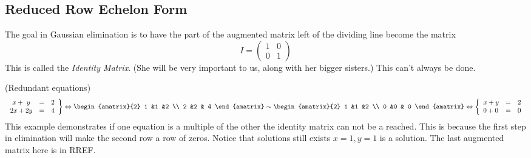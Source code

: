 \subsection{Reduced Row Echelon Form}
The goal in Gaussian elimination is to have the part of the augmented matrix left of the dividing line become the matrix
 \[I=    \begin{pmatrix}
      1             &0  \\
      0             &1
    \end{pmatrix}\] 
This is called the \emph{Identity Matrix}.  
(She will be very important to us, along with her bigger sisters.)
%
This can't always be done.

\begin{example} (Redundant equations)
 \begin{eqnarray*}
   \left.
\begin{array}{lcr}
	\ x + \ y & = & 2 \\
	2x + 2y & = &  4
     \end{array}
   \right\} 
   \Leftrightarrow
\begin{amatrix}{2}
1 &1 &2 \\ 2 &2 & 4
\end{amatrix}
\sim
\begin{amatrix}{2}
1 &1 &2 \\ 0 &0 & 0
\end{amatrix}
\Leftrightarrow
\left\{
\begin{array}{lcr}
	x + y & = & 2 \\
	 0 + 0 & = &  0
     \end{array}
   \right.
\end{eqnarray*}  
This example demonstrates if one equation is a multiple of the other the identity matrix can not be a reached. This is because the first step in elimination will make the second row a row of zeros. Notice that solutions still exists $x=1,y=1$ is a solution. The last augmented matrix here is in RREF.
\end{example}

